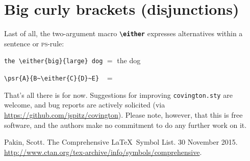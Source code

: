 \documentclass[english]{article}
\newcommand*\jmacro[1]{\textbf{\texttt{#1}}}
\newcommand*\jcsmacro[1]{\jmacro{\textbackslash{#1}}}
\begin{document}
\section{Big curly brackets (disjunctions)}

Last of all, the two-argument macro \jcsmacro{either} expresses alternatives
within a sentence or \textsc{ps}-rule:
\begin{flushleft}
\lstinline[moretexcs={either}]"the \either{big}{large} dog" $=$ the  dog \\
\end{flushleft}
\begin{flushleft}
\lstinline[moretexcs={either,psr}]"\psr{A}{B~\either{C}{D}~E} " $=$ 
\end{flushleft}

That's all there is for now.
Suggestions for improving \texttt{covington.sty} are welcome, and bug
reports are actively solicited (via \url{https://github.com/jspitz/covington}).  Please note, however, that this is free
software, and the authors make no commitment to do any further work on 
it.

\begin{thebibliography}{99}
	 Pakin, Scott. The Comprehensive \LaTeX\ Symbol List.
	30 November 2015. \url{http://www.ctan.org/tex-archive/info/symbols/comprehensive}.
\end{thebibliography}
\end{document}
